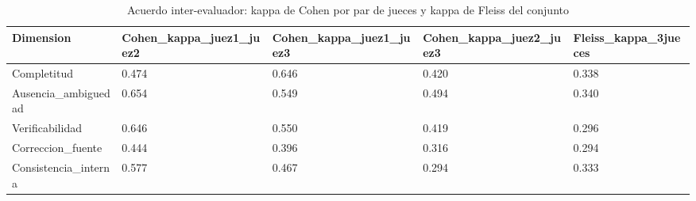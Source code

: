 \begin{table}[htbp]
\centering
\caption{Acuerdo inter-evaluador: kappa de Cohen por par de jueces y kappa de Fleiss del conjunto}
\label{tab:acuerdo}
\begin{tabular}{lllll}
\toprule
Dimension & Cohen\_kappa\_juez1\_juez2 & Cohen\_kappa\_juez1\_juez3 & Cohen\_kappa\_juez2\_juez3 & Fleiss\_kappa\_3jueces \\
\midrule
Completitud & 0.474 & 0.646 & 0.420 & 0.338 \\
Ausencia\_ambiguedad & 0.654 & 0.549 & 0.494 & 0.340 \\
Verificabilidad & 0.646 & 0.550 & 0.419 & 0.296 \\
Correccion\_fuente & 0.444 & 0.396 & 0.316 & 0.294 \\
Consistencia\_interna & 0.577 & 0.467 & 0.294 & 0.333 \\
\bottomrule
\end{tabular}
\end{table}
